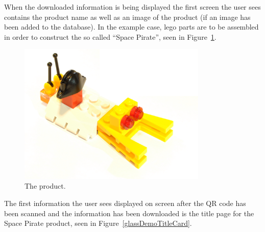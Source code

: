 When the downloaded information is being displayed the first screen the user sees contains the product name as well as an image of the product (if an image has been added to the database). In the example case, lego parts are to be assembled in order to construct the so called ``Space Pirate'', seen in Figure~\ref{glassDemoRaw}.

	\begin{figure}[ht!]
		\centering
		\includegraphics[width=90mm]{images/rawImages/BILD_6}
		\caption{The product.}
		\label{glassDemoRaw}
	\end{figure}

The first information the user sees displayed on screen after the QR code has been scanned and the information has been downloaded is the title page for the Space Pirate product, seen in Figure~\ref{glassDemoTitleCard}.

	
